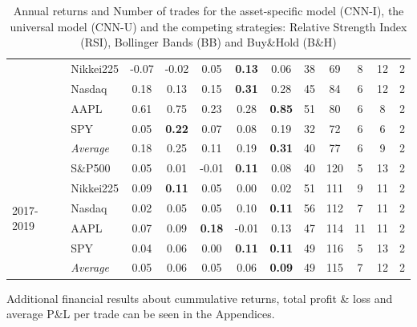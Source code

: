 \documentclass[11pt, a4paper]{article}
\begin{document}
\begin{table}[H]
\begin{tabular}{l|l|ccccc|ccccc}
  & Nikkei225    & -0.07         & -0.02         & 0.05          & \textbf{0.13} & 0.06          & 38               & 69    & 8   & 12 & 2    \\
  & Nasdaq       & 0.18          & 0.13          & 0.15          & \textbf{0.31} & 0.28          & 45               & 84    & 6   & 12 & 2    \\
  & AAPL        & 0.61          & 0.75          & 0.23          & 0.28          & \textbf{0.85} & 51               & 80    & 6   & 8  & 2    \\
  & SPY           & 0.05          & \textbf{0.22} & 0.07          & 0.08          & 0.19          & 32               & 72    & 6   & 6  & 2    \\ \cline{2-12}
  & \textit{Average} & 0.18          & 0.25          & 0.11          & 0.19          & \textbf{0.31} & 40               & 77    & 6   & 9  & 2    \\ \hline
\multirow{6}{1cm}{2017-2019} & S\&P500       & 0.05          & 0.01          & -0.01         & \textbf{0.11} & 0.08          & 40               & 120   & 5   & 13 & 2    \\
  & Nikkei225     & 0.09          & \textbf{0.11} & 0.05          & 0.00          & 0.02          & 51               & 111   & 9   & 11 & 2    \\
  & Nasdaq         & 0.02          & 0.05          & 0.05          & 0.10          & \textbf{0.11} & 56               & 112   & 7   & 11 & 2    \\
  & AAPL      & 0.07          & 0.09          & \textbf{0.18} & -0.01         & 0.13          & 47               & 114   & 11  & 11 & 2    \\
  & SPY       & 0.04          & 0.06          & 0.00          & \textbf{0.11} & \textbf{0.11} & 49               & 116   & 5   & 13 & 2    \\ \cline{2-12}
  & \textit{Average} & 0.05          & 0.06          & 0.05          & 0.06          & \textbf{0.09} & 49               & 115   & 7   & 12 & 2   
\end{tabular}
\caption{Annual returns and Number of trades for the asset-specific model (CNN-I), the universal model (CNN-U) and the competing strategies: Relative Strength Index (RSI), Bollinger Bands (BB) and Buy\&Hold (B\&H)}
\label{tbl:FinResMain}
\end{table}

Additional financial results about cummulative returns, total profit \& loss and average P\&L per trade can be seen in the Appendices.
\end{document}
